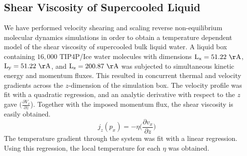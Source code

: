 \subsection{Shear Viscosity of Supercooled Liquid}
We have performed velocity shearing and scaling reverse
non-equilibrium molecular dynamics simulations in order to obtain a
temperature dependent model of the shear viscosity of supercooled bulk
liquid water. A liquid box containing $16,000$ TIP4P/Ice water
molecules with dimensions $\mathrm{L_x} = 51.22~\mathrm{\AA}$,
$\mathrm{L_y} = 51.22~\mathrm{\AA}$, and
$\mathrm{L_z}=200.87~\mathrm{\AA}$ was subjected to simultaneous
kinetic energy and momentum fluxes. This resulted in concurrent thermal
and velocity gradients across the $z$-dimension of the simulation
box. The velocity profile was fit with a quadratic regression, and an
analytic derivative with respect to the $z$ gave
$(\frac{\partial V_x}{\partial z}$). Together with the imposed
momentum flux, the shear viscosity is easily obtained.
\begin{equation}\label{eq:viscosity}
  j_{z}(p_{x}) = -\eta \big(\frac{\partial v_{x}}{\partial z}\big)
\end{equation}
The temperature gradient through the system was fit with a linear
regression. Using this regression, the local temperature for each
$\eta$ was obtained.  

